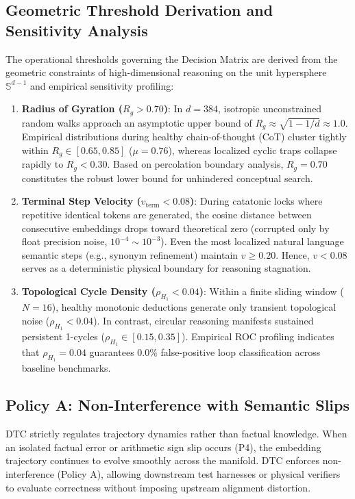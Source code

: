 \documentclass[11pt,a4paper]{article}
\begin{document}
\subsection{Geometric Threshold Derivation and Sensitivity Analysis}

The operational thresholds governing the Decision Matrix are derived from the geometric constraints of high-dimensional reasoning on the unit hypersphere $\mathbb{S}^{d-1}$ and empirical sensitivity profiling:
\begin{enumerate}
    \item \textbf{Radius of Gyration ($R_g > 0.70$)}: In $d=384$, isotropic unconstrained random walks approach an asymptotic upper bound of $R_g \approx \sqrt{1 - 1/d} \approx 1.0$. Empirical distributions during healthy chain-of-thought (CoT) cluster tightly within $R_g \in [0.65, 0.85]$ ($\mu = 0.76$), whereas localized cyclic traps collapse rapidly to $R_g < 0.30$. Based on percolation boundary analysis, $R_g = 0.70$ constitutes the robust lower bound for unhindered conceptual search.
    \item \textbf{Terminal Step Velocity ($v_{\mathrm{term}} < 0.08$)}: During catatonic locks where repetitive identical tokens are generated, the cosine distance between consecutive embeddings drops toward theoretical zero (corrupted only by float precision noise, $10^{-4} \sim 10^{-3}$). Even the most localized natural language semantic steps (e.g., synonym refinement) maintain $v \ge 0.20$. Hence, $v < 0.08$ serves as a deterministic physical boundary for reasoning stagnation.
    \item \textbf{Topological Cycle Density ($\rho_{H_1} < 0.04$)}: Within a finite sliding window ($N=16$), healthy monotonic deductions generate only transient topological noise ($\rho_{H_1} < 0.04$). In contrast, circular reasoning manifests sustained persistent 1-cycles ($\rho_{H_1} \in [0.15, 0.35]$). Empirical ROC profiling indicates that $\rho_{H_1} = 0.04$ guarantees 0.0\% false-positive loop classification across baseline benchmarks.
\end{enumerate}

\subsection{Policy A: Non-Interference with Semantic Slips}

DTC strictly regulates trajectory dynamics rather than factual knowledge. When an isolated factual error or arithmetic sign slip occurs (P4), the embedding trajectory continues to evolve smoothly across the manifold. DTC enforces non-interference (Policy A), allowing downstream test harnesses or physical verifiers to evaluate correctness without imposing upstream alignment distortion.
\end{document}

